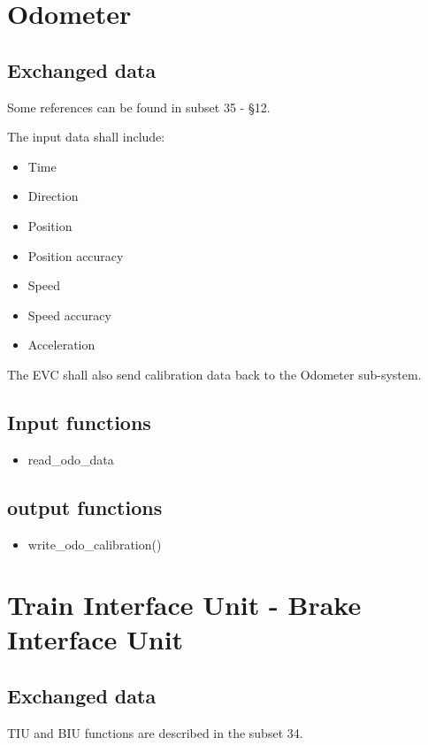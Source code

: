 \documentclass{template/openetcs_article}
\begin{document}
\section{Odometer}
	\subsection{Exchanged data}
		Some references can be found in subset 35 - §12.
		
		The input data shall include:
		\begin{itemize}
			\item Time
			\item Direction
			\item Position
			\item Position accuracy
			\item Speed
			\item Speed accuracy
			\item Acceleration
		\end{itemize}
		
		The EVC shall also send calibration data back to the Odometer sub-system.		
	\subsection{Input functions}
		\begin{itemize}
			\item read\_odo\_data
		\end{itemize}
	\subsection{output functions}
		\begin{itemize}
			\item  write\_odo\_calibration()
		\end{itemize}
\section{Train Interface Unit - Brake Interface Unit}
	\subsection{Exchanged data}
		TIU and BIU functions are described in the subset 34.
			
\end{document}
